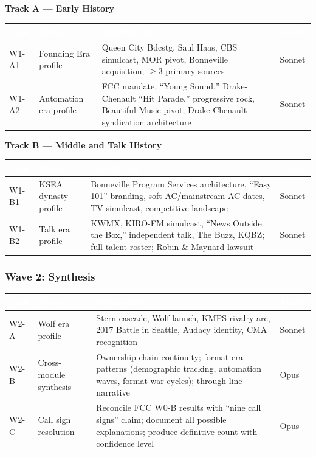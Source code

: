 \documentclass[11pt,letterpaper]{article}
\newcommand{\tableheader}[1]{\textbf{\sffamily\textcolor{white}{#1}}}
\begin{document}
\textbf{Track A --- Early History}

\begin{center}
\begin{tabularx}{\textwidth}{L{1.5cm}L{3.5cm}XC{1.5cm}}
\toprule
{}
\tableheader{Task} & \tableheader{Name} & \tableheader{Description} & \tableheader{Model} \\
\midrule
W1-A1 & Founding Era profile & Queen City Bdcstg, Saul Haas, CBS simulcast, MOR pivot, Bonneville acquisition; $\geq$3 primary sources & Sonnet \\
W1-A2 & Automation era profile & FCC mandate, ``Young Sound,'' Drake-Chenault ``Hit Parade,'' progressive rock, Beautiful Music pivot; Drake-Chenault syndication architecture & Sonnet \\
\bottomrule
\end{tabularx}
\end{center}

\textbf{Track B --- Middle and Talk History}

\begin{center}
\begin{tabularx}{\textwidth}{L{1.5cm}L{3.5cm}XC{1.5cm}}
\toprule
{}
\tableheader{Task} & \tableheader{Name} & \tableheader{Description} & \tableheader{Model} \\
\midrule
W1-B1 & KSEA dynasty profile & Bonneville Program Services architecture, ``Easy 101'' branding, soft AC/mainstream AC dates, TV simulcast, competitive landscape & Sonnet \\
W1-B2 & Talk era profile & KWMX, KIRO-FM simulcast, ``News Outside the Box,'' independent talk, The Buzz, KQBZ; full talent roster; Robin \& Maynard lawsuit & Sonnet \\
\bottomrule
\end{tabularx}
\end{center}

\subsubsection{Wave 2: Synthesis}

\begin{center}
\begin{tabularx}{\textwidth}{L{1.5cm}L{3.5cm}XC{1.5cm}}
\toprule
{}
\tableheader{Task} & \tableheader{Name} & \tableheader{Description} & \tableheader{Model} \\
\midrule
W2-A & Wolf era profile & Stern cascade, Wolf launch, KMPS rivalry arc, 2017 Battle in Seattle, Audacy identity, CMA recognition & Sonnet \\
W2-B & Cross-module synthesis & Ownership chain continuity; format-era patterns (demographic tracking, automation waves, format war cycles); through-line narrative & Opus \\
W2-C & Call sign resolution & Reconcile FCC W0-B results with ``nine call signs'' claim; document all possible explanations; produce definitive count with confidence level & Opus \\
\bottomrule
\end{tabularx}
\end{center}
\end{document}
